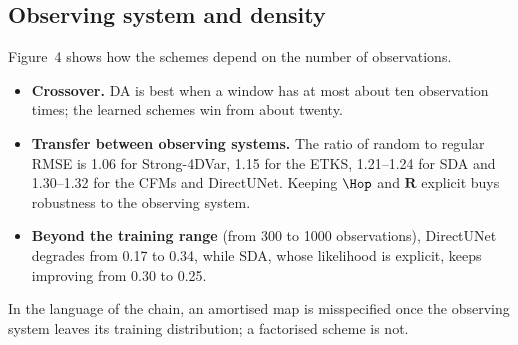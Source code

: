 \subsection{Observing system and density}\label{sec:q1-density}
Figure~4 shows how the schemes depend on the number of observations.
\begin{itemize}[leftmargin=*]
  \item \textbf{Crossover.} DA is best when a window has at most about ten
    observation times; the learned schemes win from about twenty.
  \item \textbf{Transfer between observing systems.} The ratio of random to
    regular RMSE is 1.06 for Strong-4DVar, 1.15 for the ETKS, 1.21--1.24 for
    SDA and 1.30--1.32 for the CFMs and DirectUNet. Keeping $\Hop$ and $\mathbf{R}$
    explicit buys robustness to the observing system.
  \item \textbf{Beyond the training range} (from 300 to 1000 observations),
    DirectUNet degrades from 0.17 to 0.34, while SDA, whose likelihood is
    explicit, keeps improving from 0.30 to 0.25.
\end{itemize}
In the language of the chain, an amortised map is misspecified once the
observing system leaves its training distribution; a factorised scheme is not.

